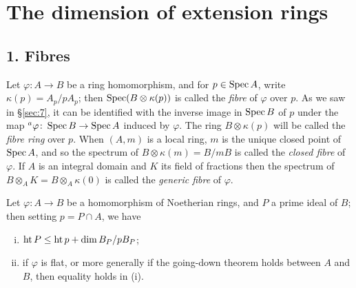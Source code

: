 \section{The dimension of extension rings}\label{sec:15}

\subsection*{1. Fibres}

Let $\varphi\colon A \to B$ be a ring homomorphism, and for $p \in \operatorname{Spec} A$, write $\kappa(p) =
A_p/pA_p$; then $\operatorname{Spec}(B \otimes \kappa(p))$ is called the \emph{fibre} of $\varphi$ over $p$. As we
saw in \S\ref{sec:7}, it can be identified with the inverse image in $\operatorname{Spec} B$ of $p$ under the
map ${}^a\varphi\colon \operatorname{Spec} B \to \operatorname{Spec} A$ induced by $\varphi$. The ring $B \otimes \kappa(p)$ will be called the
\emph{fibre ring} over $p$. When $(A, m)$ is a local ring, $m$ is the unique closed point of
$\operatorname{Spec} A$, and so the spectrum of $B \otimes \kappa(m) = B/mB$ is called the \emph{closed fibre} of
$\varphi$. If $A$ is an integral domain and $K$ its field of fractions then the spectrum of
$B \otimes_A K = B \otimes_A \kappa(0)$ is called the \emph{generic fibre} of $\varphi$.

\begin{theorem}\label{thm:15.1}
Let $\varphi\colon A \to B$ be a homomorphism of Noetherian rings,
and $P$ a prime ideal of $B$; then setting $p = P \cap A$, we have
\begin{enumerate}[(i)]
  \item $\operatorname{ht} P \le \operatorname{ht} p + \dim B_P/pB_P$;
  \item if $\varphi$ is flat, or more generally if the going-down theorem holds between
        $A$ and $B$, then equality holds in (i).
\end{enumerate}
\end{theorem}

